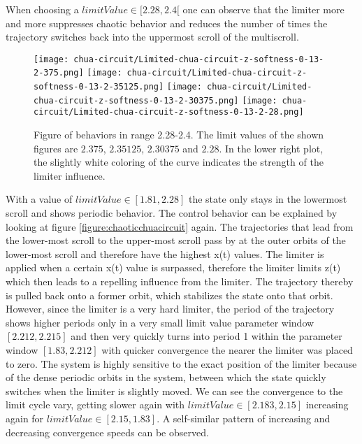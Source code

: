 \documentclass[main]{subfiles}
\begin{document}
When choosing a \(limitValue \in [2.28,2.4[\) one can observe that the limiter more and more suppresses chaotic behavior and reduces the number of times the trajectory switches back into the uppermost scroll of the multiscroll.

\begin{figure}[H]
\centering
\texttt{[image: chua-circuit/Limited-chua-circuit-z-softness-0-13-2-375.png]}
\texttt{[image: chua-circuit/Limited-chua-circuit-z-softness-0-13-2-35125.png]}
\texttt{[image: chua-circuit/Limited-chua-circuit-z-softness-0-13-2-30375.png]}
\texttt{[image: chua-circuit/Limited-chua-circuit-z-softness-0-13-2-28.png]}
\caption[Figure of behaviors in range 2.28-2.4]{Figure of behaviors in range 2.28-2.4. The limit values of the shown figures are \(2.375\), \(2.35125\), \(2.30375\) and \(2.28\). In the lower right plot, the slightly white coloring of the curve indicates the strength of the limiter influence.}
\label{figure:z-2.28-2.4-chaotictrajectories}
\end{figure}

With a value of \(limitValue \in [1.81, 2.28]\) the state only stays in the lowermost scroll and shows periodic behavior. %
%
The control behavior can be explained by looking at figure \ref{figure:chaoticchuacircuit} again. %
%
The trajectories that lead from the lower-most scroll to the upper-most scroll pass by at the outer orbits of the lower-most scroll and therefore have the highest x(t) values. %
%
The limiter is applied when a certain x(t) value is surpassed, therefore the limiter limits z(t) which then leads to a repelling influence from the limiter. %
%
The trajectory thereby is pulled back onto a former orbit, which stabilizes the state onto that orbit. %
%
However, since the limiter is a very hard limiter, the period of the trajectory shows higher periods only in a very small limit value parameter window \([2.212,2.215]\) and then very quickly turns into period 1 within the parameter window \([1.83,2.212]\) with quicker convergence the nearer the limiter was placed to zero. %
%
The system is highly sensitive to the exact position of the limiter because of the dense periodic orbits in the system, between which the state quickly switches when the limiter is slightly moved. %
%
We can see the convergence to the limit cycle vary, getting slower again with \(limitValue \in [2.183,2.15]\) increasing again for \(limitValue \in [2.15,1.83]\). %
%
A self-similar pattern of increasing and decreasing convergence speeds can be observed.
\end{document}
